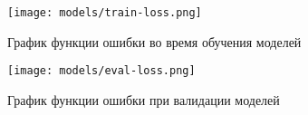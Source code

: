 \begin{figure}[!htb] 
   \centering 
   \texttt{[image: models/train-loss.png]}
   \caption{График функции ошибки во время обучения моделей} 
\end{figure} 

\begin{figure}[!htb] 
   \centering 
   \texttt{[image: models/eval-loss.png]}
   \caption{График функции ошибки при валидации моделей} 
\end{figure} 